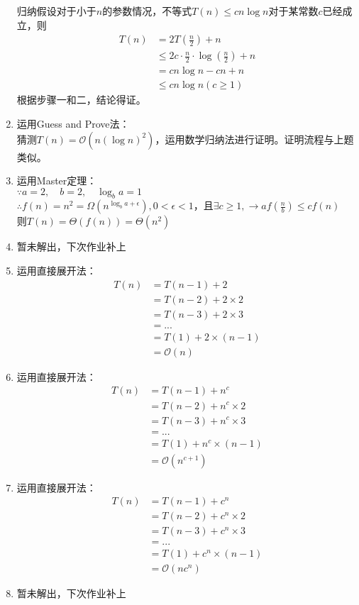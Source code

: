 \documentclass[UTF8,12pt]{article} %
\makeatletter
\theoremstyle{definition}
\newenvironment{proof}[1][\protect\proofname]{\par
\normalfont\topsep6\p@\@plus6\p@\relax
\trivlist
\itemindent\parindent
\item[\hskip\labelsep
\scshape
#1]\ignorespaces
}{%
\endtrivlist\@endpefalse
}
\renewcommand{\proofname}{\it{\textbf{证明}}}
\makeatother
\begin{document}
\begin{proof}[\textbf{解答}]
\begin{enumerate}[1)]
	归纳假设对于小于$n$的参数情况，不等式$T(n)\leq cn\log n$对于某常数$c$已经成立，则\[\begin{split}
	T(n) &= 2T(\frac{n}{2})+n\\
		&\leq 2c\cdot \frac{n}{2}\cdot \log (\frac{n}{2})+n\\
		&=cn \log n -cn +n\\
		&\leq cn \log n (c \geq 1)
	\end{split}\]
	根据步骤一和二，结论得证。

	\item 运用Guess and Prove法：\\
	猜测$T(n) = \mathcal{O}(n(\log n)^{2})$，运用数学归纳法进行证明。证明流程与上题类似。

	\item 运用Master定理：\\
	$\because a = 2, \quad b=2, \quad \log_{b}a = 1$\\
		$\therefore f(n) = n^{2} = \Omega(n^{\log_{b}a + \epsilon}), 0<\epsilon<1$，且$\exists c\geq 1, \rightarrow af(\frac{n}{b})\leq cf(n) $\\
		则$T(n) = \Theta(f(n))= \Theta(n^{2})$

	\item 暂未解出，下次作业补上

	\item 运用直接展开法：\[\begin{split}
		T(n) &=T(n-1) + 2 \\
		&= T(n-2) + 2\times 2\\
		&= T(n-3) + 2\times 3\\
		&=...\\
		&= T(1) + 2\times (n-1)\\
		&= \mathcal{O}(n)
	\end{split}\]

	\item 运用直接展开法：\[\begin{split}
		T(n) &=T(n-1) + n^{c} \\
		&= T(n-2) + n^{c}\times 2\\
		&= T(n-3) + n^{c}\times 3\\
		&=...\\
		&= T(1) + n^{c}\times (n-1)\\
		&= \mathcal{O}(n^{c+1})
	\end{split}\]	

	\item 运用直接展开法：\[\begin{split}
		T(n) &=T(n-1) + c^{n} \\
		&= T(n-2) + c^{n}\times 2\\
		&= T(n-3) + c^{n}\times 3\\
		&=...\\
		&= T(1) + c^{n}\times (n-1)\\
		&= \mathcal{O}(nc^{n})
	\end{split}\]

	\item 暂未解出，下次作业补上

\end{enumerate}
\end{proof}
\end{document}
